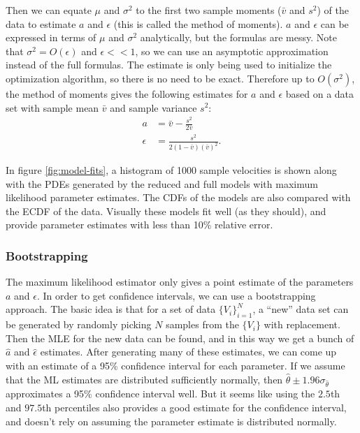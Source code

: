 \documentclass{article}
\begin{document}
Then we can equate $\mu$ and $\sigma^2$ to the first two sample
moments ($\bar{v}$ and $s^2$) of the data to estimate $a$ and
$\epsilon$ (this is called the method of moments). $a$ and $\epsilon$
can be expressed in terms of $\mu$ and $\sigma^2$ analytically, but
the formulas are messy. Note that $\sigma^2 = O(\epsilon)$ and
$\epsilon << 1$, so we can use an asymptotic approximation instead of
the full formulas. The estimate is only being used to initialize the
optimization algorithm, so there is no need to be exact. Therefore up
to $O(\sigma^2)$, the method of moments gives the following estimates
for $a$ and $\epsilon$ based on a data set with sample mean $\bar{v}$
and sample variance $s^2$:
\begin{align}
  \label{eq:mean-est}
  a &= \bar{v} - \frac{s^2}{2\bar{v}} \\
  \label{eq:var-est}
  \epsilon &= \frac{s^2}{2(1 - \bar{v})(\bar{v})^2}.
\end{align}

In figure \ref{fig:model-fits}, a histogram of 1000 sample velocities
is shown along with the PDEs generated by the reduced and full models
with maximum likelihood parameter estimates. The CDFs of the models
are also compared with the ECDF of the data. Visually these models fit
well (as they should), and provide parameter estimates with less than
10\% relative error.

\subsubsection{Bootstrapping}
\label{sec:bootstrapping}

The maximum likelihood estimator only gives a point estimate of the
parameters $a$ and $\epsilon$. In order to get confidence intervals,
we can use a bootstrapping approach. The basic idea is that for a set
of data $\{V_i\}_{i=1}^N$, a ``new'' data set can be generated by
randomly picking $N$ samples from the $\{V_i\}$ with replacement. Then
the MLE for the new data can be found, and in this way we get a bunch
of $\hat{a}$ and $\hat{\epsilon}$ estimates. After generating many of
these estimates, we can come up with an estimate of a 95\% confidence
interval for each parameter. If we assume that the ML estimates are
distributed sufficiently normally, then
$\hat{\theta} \pm 1.96 \sigma_{\hat{\theta}}$ approximates a 95\%
confidence interval well. But it seems like using the $2.5$th and
$97.5$th percentiles also provides a good estimate for the confidence
interval, and doesn't rely on assuming the parameter estimate is
distributed normally.
\end{document}
